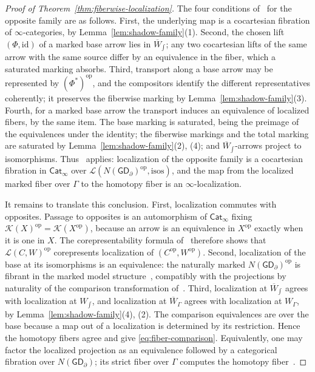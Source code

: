 \documentclass[11pt,letterpaper,twoside]{article}
\theoremstyle{plain}
\theoremstyle{definition}
\theoremstyle{remark}
\let\cite\citep
\newcommand{\BGrm}{\mathsf{GD}_{\partial}}
\begin{document}
\begin{proof}[Proof of Theorem~\ref{thm:fiberwise-localization}]
The four conditions of~\cite[Def.~2.1.1]{hinich2016} for the opposite family are as follows.  First, the underlying map is a cocartesian fibration of \(\infty\)-categories, by Lemma~\ref{lem:shadow-family}(1).  Second, the chosen lift \((\Phi,\mathrm{id})\) of a marked base arrow lies in \(\overline W_{\int}\); any two cocartesian lifts of the same arrow with the same source differ by an equivalence in the fiber, which a saturated marking absorbs.  Third, transport along a base arrow may be represented by \((\Phi^*)^{\mathrm{op}}\), and the compositors identify the different representatives coherently; it preserves the fiberwise marking by Lemma~\ref{lem:shadow-family}(3).  Fourth, for a marked base arrow the transport induces an equivalence of localized fibers, by the same item.  The base marking is saturated, being the preimage of the equivalences under the identity; the fiberwise markings and the total marking are saturated by Lemma~\ref{lem:shadow-family}(2), (4); and \(\overline W_{\int}\)-arrows project to isomorphisms.  Thus~\cite[Prop.~2.1.4]{hinich2016} applies: localization of the opposite family is a cocartesian fibration in \(\mathsf{Cat}_\infty\) over \(\mathcal L(N(\BGrm)^{\mathrm{op}},\text{isos})\), and the map from the localized marked fiber over \(\Gamma\) to the homotopy fiber is an \(\infty\)-localization.

It remains to translate this conclusion.  First, localization commutes with opposites.  Passage to opposites is an automorphism of \(\mathsf{Cat}_\infty\) fixing \(\mathcal K(X)^{\mathrm{op}}=\mathcal K(X^{\mathrm{op}})\), because an arrow is an equivalence in \(X^{\mathrm{op}}\) exactly when it is one in \(X\).  The corepresentability formula of~\cite[\S1.1.2]{hinich2016} therefore shows that \(\mathcal L(C,W)^{\mathrm{op}}\) corepresents localization of \((C^{\mathrm{op}},W^{\mathrm{op}})\).  Second, localization of the base at its isomorphisms is an equivalence: the naturally marked \(N(\BGrm)^{\mathrm{op}}\) is fibrant in the marked model structure~\cite[Prop.~3.1.4.1]{lurie2009htt}, compatibly with the projections by naturality of the comparison transformation of~\cite[\S1.1.3]{hinich2016}.  Third, localization at \(\overline W_{\int}\) agrees with localization at \(W_{\int}\), and localization at \(\overline W_\Gamma\) agrees with localization at \(W_\Gamma\), by Lemma~\ref{lem:shadow-family}(4), (2).  The comparison equivalences are over the base because a map out of a localization is determined by its restriction.  Hence the homotopy fibers agree and give \eqref{eq:fiber-comparison}.  Equivalently, one may factor the localized projection as an equivalence followed by a categorical fibration over \(N(\BGrm)\); its strict fiber over \(\Gamma\) computes the homotopy fiber~\cite[Rem.~A.2.4.5]{lurie2009htt}.
\end{proof}
\end{document}
